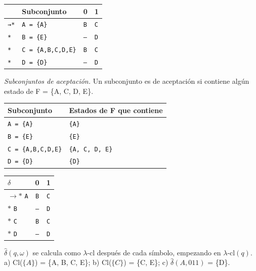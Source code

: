 \documentclass[11pt]{article}
\begin{document}
\begin{center}\footnotesize\begin{tabular}{llll}\toprule
 & Subconjunto & 0 & 1 \\\midrule
\texttt{→*} & \texttt{A = \{A\}} & \texttt{B} & \texttt{C} \\
\texttt{*} & \texttt{B = \{E\}} & \texttt{—} & \texttt{D} \\
\texttt{*} & \texttt{C = \{A,B,C,D,E\}} & \texttt{B} & \texttt{C} \\
\texttt{*} & \texttt{D = \{D\}} & \texttt{—} & \texttt{D} \\
\bottomrule\end{tabular}\end{center}
\textit{Subconjuntos de aceptación.} Un subconjunto es de aceptación si contiene algún estado de F = \{A, C, D, E\}.
\begin{center}\footnotesize\begin{tabular}{ll}\toprule
Subconjunto & Estados de F que contiene \\\midrule
\texttt{A = \{A\}} & \texttt{\{A\}} \\
\texttt{B = \{E\}} & \texttt{\{E\}} \\
\texttt{C = \{A,B,C,D,E\}} & \texttt{\{A, C, D, E\}} \\
\texttt{D = \{D\}} & \texttt{\{D\}} \\
\bottomrule\end{tabular}\end{center}
\begin{center}\small\begin{tabular}{lcc}\toprule
$\delta$ & 0 & 1 \\\midrule
$\to$$*$ \texttt{A} & \texttt{B} & \texttt{C} \\
$*$ \texttt{B} & \texttt{--} & \texttt{D} \\
$*$ \texttt{C} & \texttt{B} & \texttt{C} \\
$*$ \texttt{D} & \texttt{--} & \texttt{D} \\
\bottomrule\end{tabular}\end{center}
$\hat\delta(q, \omega)$ se calcula como $\lambda$-cl después de cada símbolo, empezando en $\lambda$-cl$(q)$.
\resp a) Cl($\{A\}$) = \{A, B, C, E\}; b) Cl($\{C\}$) = \{C, E\}; c) $\hat\delta(A, 011)$ = \{D\}.
\end{document}

